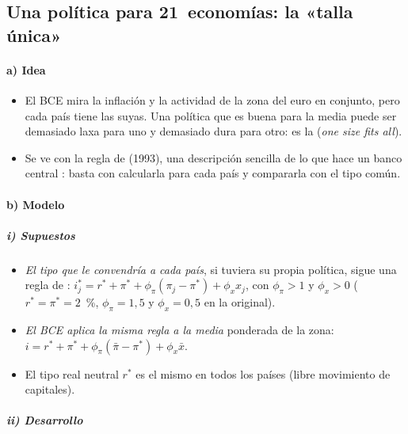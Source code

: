 \documentclass[11pt]{article}
\begin{document}
\subsection{Una política para 21~economías: la «talla única»}\label{sec:talla-unica}

\paragraph{a) Idea}

\begin{itemize}
\item El BCE mira la inflación y la actividad de la zona del euro en conjunto, pero cada país tiene las suyas. Una política que es buena para la media puede ser demasiado laxa para uno y demasiado dura para otro: es la  (\emph{one size fits all}).
\item Se ve con la regla de  (1993), una descripción sencilla de lo que hace un banco central : basta con calcularla para cada país y compararla con el tipo común.
\end{itemize}

\paragraph{b) Modelo}

\subparagraph{i) Supuestos}

\begin{itemize}
\item \emph{El tipo que le convendría a cada país}, si tuviera su propia política, sigue una regla de : $i_j^*=r^*+\pi^*+\phi_\pi(\pi_j-\pi^*)+\phi_x x_j$, con $\phi_\pi>1$ y $\phi_x>0$ ($r^*=\pi^*=2$~\%, $\phi_\pi=1{,}5$ y $\phi_x=0{,}5$ en la original)\nocite{Taylor1993}.
\item \emph{El BCE aplica la misma regla a la media} ponderada de la zona: $i=r^*+\pi^*+\phi_\pi(\bar\pi-\pi^*)+\phi_x\bar x$.
\item El tipo real neutral $r^*$ es el mismo en todos los países (libre movimiento de capitales).
\end{itemize}

\subparagraph{ii) Desarrollo}
\end{document}
